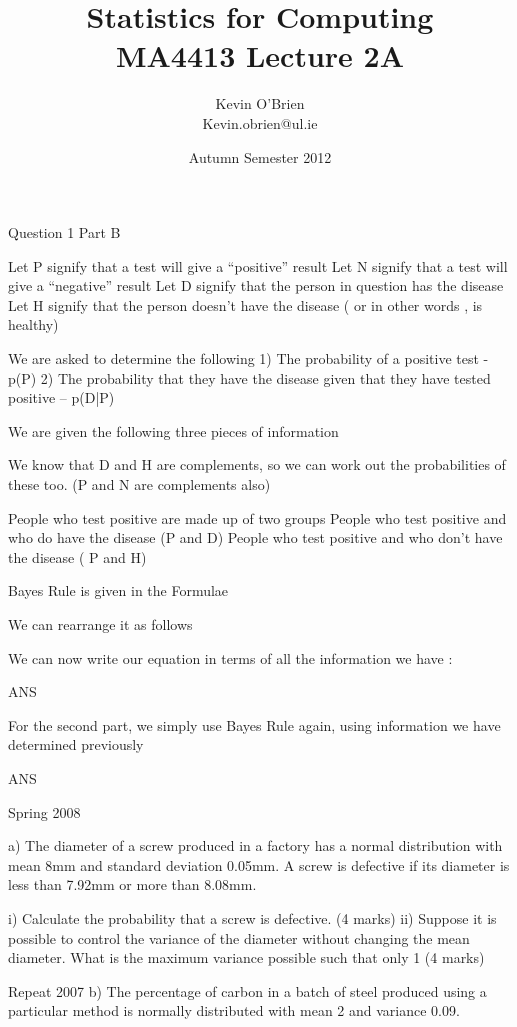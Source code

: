 \documentclass[a4]{beamer}
\title[MathsCast]{Statistics for Computing \\ {\normalsize MA4413 Lecture 2A}}
\author[Kevin O'Brien]{Kevin O'Brien \\ {\scriptsize Kevin.obrien@ul.ie}}
\date{Autumn Semester 2012}
\institute[Maths \& Stats]{Dept. of Mathematics \& Statistics, \\ University \textit{of} Limerick}
\begin{document}
Question 1 Part B

Let P signify that a test will give a “positive” result 
Let N signify that a test will give a “negative” result	
Let D signify that the person in question has the disease
Let H signify that the person doesn’t have the disease ( or in other words , is healthy) 

We are asked to determine the following 
1) The probability of a positive test - p(P)
2) The probability that they have the disease given that they have tested positive – p(D|P)
	

We are given the following three pieces of information
 

We know that D and H are complements, so we can work out the probabilities of these too. (P and N are complements also)

 

People who test positive are made up of two groups
	People who test positive and who do have the disease  (P and D)
	People who test positive and who don’t have the disease  ( P and H)

	 

Bayes Rule is given in the Formulae 		 

We can rearrange it as follows 		 

We can now write our equation in terms of all the information we have :

   ANS


For the second part, we simply use Bayes Rule again, using information we have determined previously

  ANS



Spring 2008

a)	The diameter of a screw produced in a factory has a normal distribution with mean 8mm and standard deviation 0.05mm. A screw is defective if its diameter is less than 7.92mm or more than 8.08mm.

i)	Calculate the probability that a screw is defective.
(4 marks)
ii) 	Suppose it is possible to control the variance of the diameter without changing the mean diameter. What is the maximum variance possible such that only 1%
(4 marks)

Repeat 2007
b) The percentage of carbon in a batch of steel produced using a particular method is normally distributed with mean 2 and variance 0.09. 
\end{document}

